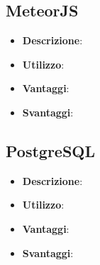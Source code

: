 \subsection{MeteorJS}
\begin{itemize}
	\item \textbf{Descrizione}:
	\item \textbf{Utilizzo}:
	\item \textbf{Vantaggi}:
	\item \textbf{Svantaggi}:
\end{itemize}

\subsection{PostgreSQL}
\begin{itemize}
	\item \textbf{Descrizione}:
	\item \textbf{Utilizzo}:
	\item \textbf{Vantaggi}:
	\item \textbf{Svantaggi}:
\end{itemize}



